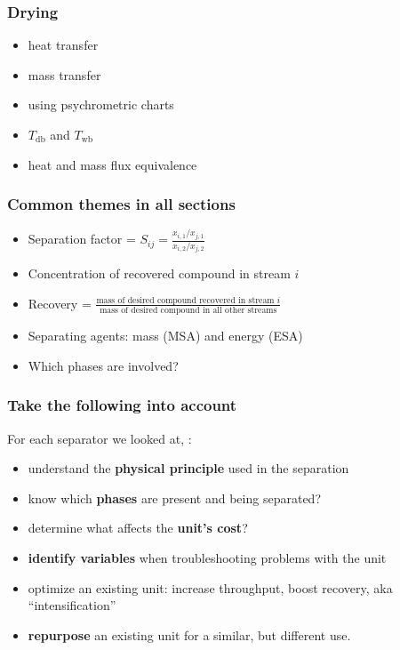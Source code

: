{
\begin{frame}\frametitle{Drying {}}
	\begin{itemize}
		\item	heat transfer
		\item	mass transfer
		\item	using psychrometric charts
		\item	$T_\text{db}$ and $T_\text{wb}$
		\item	heat and mass flux equivalence
	\end{itemize}
\end{frame}}

\begin{frame}\frametitle{Common themes in all sections}
	\begin{itemize}
		\item	Separation factor = $S_{ij} = \displaystyle \frac{x_{i,1} / x_{j,1}}{x_{i,2} / x_{j,2}}$
		\item	Concentration of recovered compound in stream $i$
		\item	Recovery = $\displaystyle\frac{\text{mass of desired compound recovered in stream~} i}{\text{mass of desired compound in all other streams}}$
		\item	Separating agents: mass (MSA) and energy (ESA)
		\item	Which phases are involved?
	\end{itemize}
\end{frame}

\begin{frame}\frametitle{Take the following into account}
	For each separator we looked at, {\color{myOrange}{please aim to}}:
	\vspace{12pt}
	\begin{itemize}
		\item	understand the \textbf{physical principle} used in the separation
		\item	know which \textbf{phases} are present and being separated?
		\item	determine what affects the \textbf{unit's cost}?
		\item	\textbf{identify variables} when troubleshooting problems with the unit
		\item	optimize an existing unit: increase throughput, boost recovery, aka ``intensification''
		\item	\textbf{repurpose} an existing unit for a similar, but different use.
	\end{itemize}
\end{frame}

